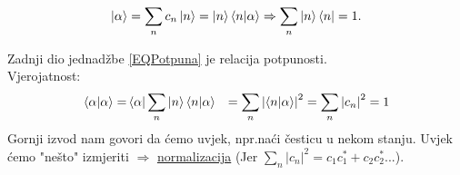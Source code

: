 \documentclass{article}
\numberwithin{equation}{section}
\begin{document}
\begin{equation}
	\ket{\alpha} = \sum_n c_n \ket{n} = \ket{n}\braket{n|\alpha} \Rightarrow \sum_n \ket{n}\bra{n} = 1.
	\label{EQPotpuna}
\end{equation}

Zadnji dio jednadžbe \ref{EQPotpuna} je relacija potpunosti.\\
Vjerojatnost:
\begin{equation}
	\begin{aligned}
		\braket{\alpha|\alpha} =& \braket{\alpha|\sum_n|n}\braket{n|\alpha}
		&= \sum_n \left|\braket{n|\alpha}\right|^2 = \sum_n \left|c_n\right|^2=1
	\end{aligned}
\end{equation}
Gornji izvod nam govori da ćemo uvjek, npr.naći česticu u nekom stanju. Uvjek ćemo "nešto" izmjeriti $\Rightarrow$ \underline{normalizacija}
(Jer $\sum_n\left|c_n\right|^2 = c_1c_1^* + c_2c_2^*...$).
\end{document}
